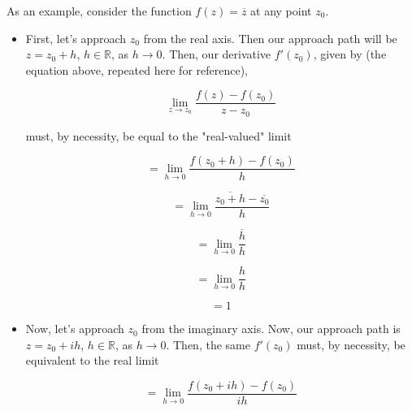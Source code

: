 \documentclass{article}
\newcommand*\conj[1]{\overline{#1}}
\begin{document}
As an example, consider the function $f(z) = \conj{z}$ at any point $z_0$. 
\begin{itemize}
	\item First, let's approach $z_0$ from the real axis. Then our approach path will be $z = z_0 + h$, $h \in \mathbb{R}$, as $h \rightarrow 0$. Then, our derivative $f'(z_0)$, given by (the equation above, repeated here for reference),
	
\begin{equation}
\lim_{z \to z_0}\frac{f(z)-f(z_0)}{z-z_0}
\end{equation}


must, by necessity, be equal to the "real-valued" limit

\begin{equation}
= \lim_{h \to 0}\frac{f(z_0 + h)-f(z_0)}{h}
\end{equation}

\begin{equation}
= \lim_{h \to 0}\frac{\conj{z_0 + h}-\conj{z_0}}{h}
\end{equation}

\begin{equation}
= \lim_{h \to 0}\frac{\conj{h}}{h}
\end{equation}

\begin{equation}
= \lim_{h \to 0}\frac{h}{h}
\end{equation}

\begin{equation}
= 1
\end{equation}


	\item Now, let's approach $z_0$ from the imaginary axis. Now, our approach path is $z = z_0 + ih$, $h \in \mathbb{R}$, as $h \rightarrow 0$. Then, the same $f'(z_0)$ must, by necessity, be equivalent to the real limit

\begin{equation}
= \lim_{h \to 0}\frac{f(z_0 + ih)-f(z_0)}{ih}
\end{equation}


\end{itemize}
\end{document}
